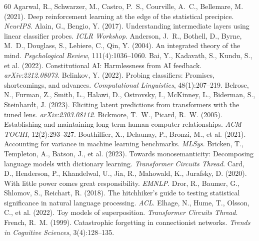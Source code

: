 \documentclass[11pt]{article}
\begin{document}
\begin{thebibliography}{60}
 Agarwal, R., Schwarzer, M., Castro, P.~S., Courville, A.~C., Bellemare, M. (2021). Deep reinforcement learning at the edge of the statistical precipice. \emph{NeurIPS}.
 Alain, G., Bengio, Y. (2017). Understanding intermediate layers using linear classifier probes. \emph{ICLR Workshop}.
 Anderson, J.~R., Bothell, D., Byrne, M.~D., Douglass, S., Lebiere, C., Qin, Y. (2004). An integrated theory of the mind. \emph{Psychological Review}, 111(4):1036--1060.
 Bai, Y., Kadavath, S., Kundu, S., et al. (2022). Constitutional AI: Harmlessness from AI feedback. \emph{arXiv:2212.08073}.
 Belinkov, Y. (2022). Probing classifiers: Promises, shortcomings, and advances. \emph{Computational Linguistics}, 48(1):207--219.
 Belrose, N., Furman, Z., Smith, L., Halawi, D., Ostrovsky, I., McKinney, L., Biderman, S., Steinhardt, J. (2023). Eliciting latent predictions from transformers with the tuned lens. \emph{arXiv:2303.08112}.
 Bickmore, T.~W., Picard, R.~W. (2005). Establishing and maintaining long-term human-computer relationships. \emph{ACM TOCHI}, 12(2):293--327.
 Bouthillier, X., Delaunay, P., Bronzi, M., et al. (2021). Accounting for variance in machine learning benchmarks. \emph{MLSys}.
 Bricken, T., Templeton, A., Batson, J., et al. (2023). Towards monosemanticity: Decomposing language models with dictionary learning. \emph{Transformer Circuits Thread}.
 Card, D., Henderson, P., Khandelwal, U., Jia, R., Mahowald, K., Jurafsky, D. (2020). With little power comes great responsibility. \emph{EMNLP}.
 Dror, R., Baumer, G., Shlomov, S., Reichart, R. (2018). The hitchhiker's guide to testing statistical significance in natural language processing. \emph{ACL}.
 Elhage, N., Hume, T., Olsson, C., et al. (2022). Toy models of superposition. \emph{Transformer Circuits Thread}.
 French, R.~M. (1999). Catastrophic forgetting in connectionist networks. \emph{Trends in Cognitive Sciences}, 3(4):128--135.

\end{thebibliography}
\end{document}
